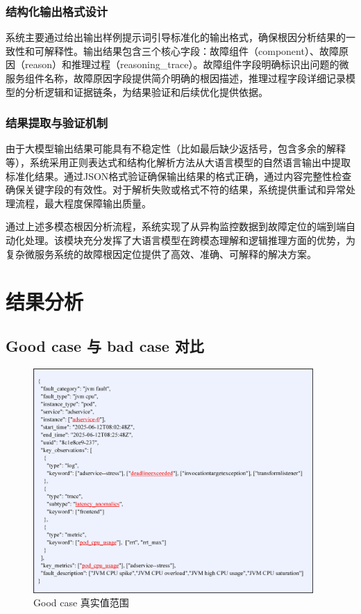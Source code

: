\documentclass[11pt]{article}
\begin{document}
\subsubsection{结构化输出格式设计}

系统主要通过给出输出样例提示词引导标准化的输出格式，确保根因分析结果的一致性和可解释性。输出结果包含三个核心字段：故障组件（component）、故障原因（reason）和推理过程（reasoning\_trace）。故障组件字段明确标识出问题的微服务组件名称，故障原因字段提供简介明确的根因描述，推理过程字段详细记录模型的分析逻辑和证据链条，为结果验证和后续优化提供依据。

\subsubsection{结果提取与验证机制}

由于大模型输出结果可能具有不稳定性（比如最后缺少返括号，包含多余的解释等），系统采用正则表达式和结构化解析方法从大语言模型的自然语言输出中提取标准化结果。通过JSON格式验证确保输出结果的格式正确，通过内容完整性检查确保关键字段的有效性。对于解析失败或格式不符的结果，系统提供重试和异常处理流程，最大程度保障输出质量。

通过上述多模态根因分析流程，系统实现了从异构监控数据到故障定位的端到端自动化处理。该模块充分发挥了大语言模型在跨模态理解和逻辑推理方面的优势，为复杂微服务系统的故障根因定位提供了高效、准确、可解释的解决方案。

\section{结果分析}

\subsection{Good case 与 bad case 对比}

\begin{figure}[htbp]
    \centering
    \includegraphics[width=0.95\textwidth]{pics/fig19.png}
    \caption{Good case 真实值范围}
    \label{fig19}
\end{figure}
\end{document}
